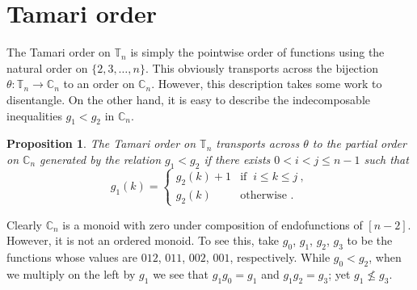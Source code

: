 \documentclass[a4paper,12pt,reqno]{amsart}
\newtheorem{proposition}[theorem]{Proposition}
\theoremstyle{definition}
\theoremstyle{fact}
\theoremstyle{genquest}
\theoremstyle{step}
\newcommand{\lra}{\longrightarrow}
\begin{document}
\section{Tamari order} 

The Tamari order on $\mathbb{T}_n$ is simply the pointwise order of functions using the natural order on $\{2,3,\dots , n \}$.  
This obviously transports across the bijection $\theta : \mathbb{T}_n \lra \mathbb{C}_n$ to an order on $\mathbb{C}_n$.
However, this description takes some work to disentangle. On the other hand, it is easy to describe the indecomposable
inequalities $g_1 < g_2$ in $\mathbb{C}_n$.  

\begin{proposition} The Tamari order on $\mathbb{T}_n$ transports across $\theta$ to the partial order on 
$\mathbb{C}_n$ generated by the relation
$g_1 < g_2$ if there exists $0<i<j \le n-1$ such that 
\begin{equation*}
  g_1 (k) =
      \begin{cases}
         g_2 (k) + 1 & \text{if } \  i \le k \le j \ , \\
         g_2 (k) & \text{otherwise }.
       \end{cases}
\end{equation*}
\end{proposition}

Clearly $\mathbb{C}_n$ is a monoid with zero under composition of endofunctions of $[n-2]$.
However, it is not an ordered monoid. To see this, take $g_0$, $g_1$, $g_2$, $g_3$ to be the functions
whose values are $012$, $011$, $002$, $001$, respectively. While $g_0 < g_2$, when we multiply
on the left by $g_1$ we see that $g_1 g_0 = g_1$ and $g_1 g_2 = g_3$; yet $g_1 \nleq g_3$. 
\end{document}
